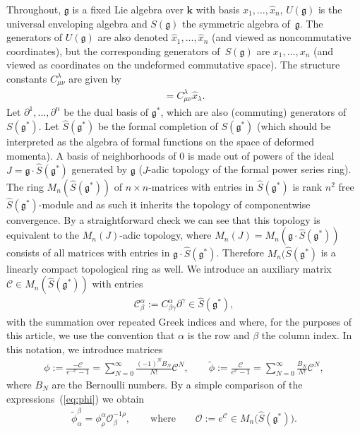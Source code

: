 \documentclass[10pt,a4paper]{amsart}
\def\genfd{\mathbf{k}}
\def\gg{\mathfrak{g}}
\def\CC{\mathcal{C}}
\def\OO{\mathcal{O}}
\def\hx{\hat{x}}
\numberwithin{equation}{section}
\begin{document}
Throughout, $\gg$ is a fixed Lie algebra over $\genfd$ with basis $\hx_1,\dots,\hx_n$, $U(\gg)$ is the universal enveloping algebra and $S(\gg)$ the symmetric algebra of~$\gg$. The generators of $U(\gg)$ are also denoted $\hx_1,\dots,\hx_n$ (and viewed as noncommutative coordinates), but the corresponding generators of~$S(\gg)$ are $x_1,\dots,x_n$ (and viewed as coordinates on the undeformed commutative space). The structure constants $C_{\mu\nu}^\lambda$ are given by
\begin{gather*}%
[\hx_\mu,\hx_\nu] = C_{\mu\nu}^\lambda \hx_\lambda.
\end{gather*}
Let $\partial^1,\dots,\partial^n$ be the dual basis of $\gg^*$, which are also (commuting) generators of $S(\gg^*)$. Let $\hat{S}(\gg^*)$ be the formal completion of $S(\gg^*)$ (which should be interpreted as the algebra of formal functions on the space of deformed momenta). A basis of neighborhoods of $0$ is made out of powers of the ideal $J = \gg\cdot\hat{S}(\gg^*)$ generated by $\gg$ ($J$-adic topology of the formal power series ring). The ring $M_n(\hat{S}(\gg^*))$ of $n\times n$-matrices with entries in $\hat{S}(\gg^*)$ is rank $n^2$ free $\hat{S}(\gg^*)$-module and as such it inherits the topology of componentwise convergence. By a straightforward check we can see that this topology is equivalent to the $M_n(J)$-adic topology, where $M_n(J) = M_n(\gg\cdot\hat{S}(\gg^*))$ consists of all matrices with entries in $\gg\cdot\hat{S}(\gg^*)$. Therefore $M_n(\hat{S}(\gg^*)$ is a linearly compact topological ring as well. We introduce an auxiliary matrix $\CC\in M_n(\hat{S}(\gg^*))$ with entries
\begin{gather}\label{CCmatrix}
\CC^\alpha_\beta := C^\alpha_{\beta\gamma}\partial^\gamma \in \hat{S}(\gg^*),
\end{gather}
with the summation over repeated Greek indices and where, for the purposes of this article, we use the convention that $\alpha$ is the row and $\beta$ the column index. In this notation, we introduce matrices
\begin{gather}\label{eq:phi}
\phi := \frac{-\CC}{e^{-\CC} -1} =\sum_{N=0}^\infty \frac{(-1)^N B_N}{N!} \CC^N, \qquad \tilde{\phi} := \frac{\CC}{e^{\CC} -1} =\sum_{N=0}^\infty \frac{B_N}{N!} \CC^N,
\end{gather}
where $B_N$ are the Bernoulli numbers. By a simple comparison of the expressions~(\ref{eq:phi}) we obtain
\begin{gather}\label{eq:phiphiO}
\tilde\phi_\alpha^\beta = \phi^\alpha_\rho \OO^{-1\rho}_\beta,\qquad \text{where}\qquad \OO := e^\CC\in M_n\big(\hat{S}(\gg^*)\big).
\end{gather}
\end{document}
